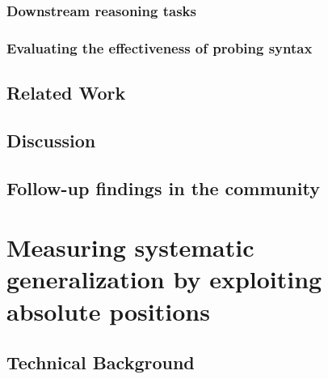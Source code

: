 \documentclass[letterpaper, 12pt]{report}
\begin{document}
\subsection{Downstream reasoning tasks}
\label{sec:orge082779}



\subsection{Evaluating the effectiveness of probing syntax}
\label{sec:org56442b4}


\section{Related Work}
\label{sec:org0d2da32}
\section{Discussion}
\label{sec:org2941af9}
\section{Follow-up findings in the community}
\label{sec:orgde3bd47}
\clearpage
\chapter{Measuring systematic generalization by exploiting absolute positions}
\label{sec:orga46bf45}

\section{Technical Background}
\label{sec:orge8b9409}
\end{document}
